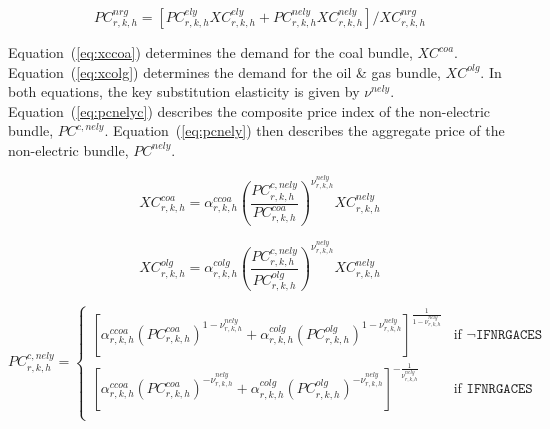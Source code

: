\documentclass[11pt,letterpaper]{report}
\begin{document}
\begin{equation}
\label{eq:pcnrg}
\mathit{PC}^{\mathit{nrg}}_{r,k,h} =
\left[
\mathit{PC}^{\mathit{ely}}_{r,k,h} \mathit{XC}^{\mathit{ely}}_{r,k,h}
+ \mathit{PC}^{\mathit{nely}}_{r,k,h} \mathit{XC}^{\mathit{nely}}_{r,k,h}
\right]
\bigg / \mathit{XC}^{\mathit{nrg}}_{r,k,h}
\end{equation}

Equation~(\ref{eq:xccoa}) determines the demand for the coal bundle,
$\mathit{XC}^{\mathit{coa}}$. Equation~(\ref{eq:xcolg}) determines the demand
for the oil \& gas bundle, $\mathit{XC}^{\mathit{olg}}$. In both equations, the
key substitution elasticity is given by $\nu^{\mathit{nely}}$.
Equation~(\ref{eq:pcnelyc}) describes the composite price index of the
non-electric bundle, $\mathit{PC}^{\mathit{c,nely}}$.
Equation~(\ref{eq:pcnely}) then describes the aggregate price of the
non-electric bundle, $\mathit{PC}^{\mathit{nely}}$.

\begin{equation}
\label{eq:xccoa}
\mathit{XC}^{\mathit{coa}}_{r,k,h} =
   \alpha^{\mathit{ccoa}}_{\mathit{r,k,h}}
   \left( \frac {\mathit{PC}^{\mathit{c,nely}}_{r,k,h}}
      {\mathit{PC}^{\mathit{coa}}_{r,k,h}}
   \right)^{\nu^{\mathit{nely}}_{\mathit{r,k,h}}}
   \mathit{XC}^{\mathit{nely}}_{r,k,h}
\end{equation}

\begin{equation}
\label{eq:xcolg}
\mathit{XC}^{\mathit{olg}}_{r,k,h} =
   \alpha^{\mathit{colg}}_{\mathit{r,k,h}}
   \left( \frac {\mathit{PC}^{c,\mathit{nely}}_{r,k,h}}
      {\mathit{PC}^{\mathit{olg}}_{r,k,h}}
   \right)^{\nu^{\mathit{nely}}_{\mathit{r,k,h}}}
   \mathit{XC}^{\mathit{nely}}_{r,k,h}
\end{equation}

\begin{equation}
\label{eq:pcnelyc}
\mathit{PC}^{c,\mathit{nely}}_{r,k,h} =
\begin{cases}
   \left[
      \alpha^{\mathit{ccoa}}_{\mathit{r,k,h}}
      \left( \mathit{PC}^{\mathit{coa}}_{r,k,h}
      \right)^{1 - \nu^{\mathit{nely}}_{\mathit{r,k,h}}}
   +  \alpha^{\mathit{colg}}_{\mathit{r,k,h}}
      \left( \mathit{PC}^{\mathit{olg}}_{r,k,h}
      \right)^{1 - \nu^{\mathit{nely}}_{\mathit{r,k,h}}}
   \right]^{\frac{1} {1 - \nu^{\mathit{nely}}_{\mathit{r,k,h}}}} &
   \textrm{if } \lnot \texttt{IFNRGACES} \\
   \left[
      \alpha^{\mathit{ccoa}}_{\mathit{r,k,h}}
      \left( \mathit{PC}^{\mathit{coa}}_{r,k,h}
      \right)^{- \nu^{\mathit{nely}}_{\mathit{r,k,h}}}
   +  \alpha^{\mathit{colg}}_{\mathit{r,k,h}}
      \left( \mathit{PC}^{\mathit{olg}}_{r,k,h}
      \right)^{- \nu^{\mathit{nely}}_{\mathit{r,k,h}}}
   \right]^{-\frac{1} {\nu^{\mathit{nely}}_{\mathit{r,k,h}}}} &
   \textrm{if } \texttt{IFNRGACES} \\
\end{cases}
\end{equation}
\end{document}
